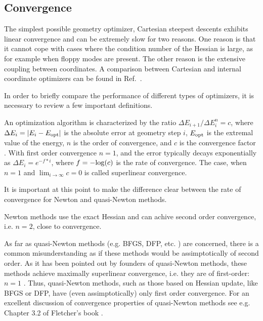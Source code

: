 \documentclass[prl,twocolumn,showpacs,twocolumngrid,superbib]{revtex4}
\begin{document}
\subsection{Convergence}

The simplest possible geometry optimizer, Cartesian steepest descents exhibits linear convergence and can 
be extremely slow for two reasons. One reason is that it cannot cope with 
cases where the condition number of the Hessian is large, 
as for example when floppy modes are present. 
The other reason is the extensive coupling between coordinates.
A comparison between Cartesian and internal coordinate optimizers can be
found in Ref.~\cite{bakerstest}.

In order to briefly compare the performance of different types of optimizers,
it is necessary to review a few important definitions.


An optimization algorithm is characterized by the ratio $ {\Delta E_{i+1}}/{\Delta E_{i}^n} =c$,
where $\Delta E_i = |E_{i}-E_{\rm opt}| $ is the absolute error at geometry step $i$,
$E_{\rm opt}$ is the extremal value of the energy, $n$ is the order of convergence, 
and $c$ is the convergence factor \cite{Quarteroni}.  With first order convergence $n=1$, and
the error typically decays exponentially as $\Delta E_i = e^{-f*i}$, where $f=-{\rm log}(c)$ is the 
rate of convergence. 
The case, when $n=1$ and $\lim_{i \to \infty} c = 0$ is called superlinear convergence.

It is important at this point to make the difference clear between the 
rate of convergence for Newton and quasi-Newton methods. 

Newton methods use the exact Hessian and can achive second order 
convergence, i.e. $n=2$, close to convergence.

As far as quasi-Newton methods (e.g. BFGS, DFP, etc. \cite{RFletcher})
are concerned, there is a common 
misunderstanding as if these methods would be assimptotically of second order.
As it has been pointed out by founders of quasi-Newton methods,
these methods achieve maximally superlinear convergence, i.e. they are
of first-order: $n=1$ \cite{RFletcher}. Thus, quasi-Newton methods,
such as those based on Hessian update, like BFGS or DFP, have 
(even assimptotically) only
first order convergence. For an excellent discussion of convergence
properties of quasi-Newton methods see e.g. Chapter 3.2 of Fletcher's book
\cite{RFletcher}.
\end{document}
